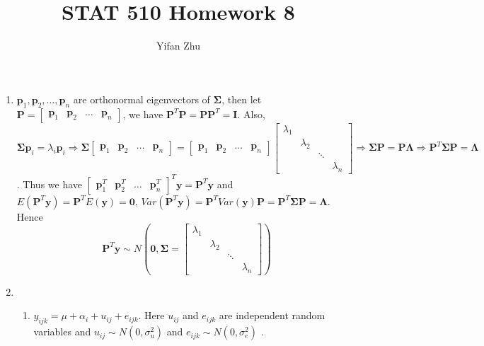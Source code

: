 \documentclass{article}
\begin{document}
\setcounter{MaxMatrixCols}{20}



\title{STAT 510 Homework 8}
\author{Yifan Zhu}
\maketitle

\begin{enumerate}[leftmargin = 0 em, label = \arabic*., font = \bfseries]
	\item
	$\bm p_1, \bm p_2 , \ldots , \bm p_n$ are orthonormal eigenvectors of $\bm \Sigma$, then let $\bm P = \begin{bmatrix}
		\bm p_1 & \bm p_2 & \ldots & \bm p_n
	\end{bmatrix}$, we have $\bm P^T \bm P = \bm P \bm P^T = \bm I$. Also, $\bm \Sigma \bm p_i = \lambda_i  \bm p_i \Rightarrow \bm \Sigma \begin{bmatrix}
		\bm p_1 & \bm p_2 & \ldots & \bm p_n
	\end{bmatrix} = \begin{bmatrix}
		\bm p_1 & \bm p_2 & \ldots & \bm p_n
	\end{bmatrix} \begin{bmatrix}
		\lambda_1 & \\
		& \lambda_2\\
		&& \ddots\\
		&&& \lambda_n

	\end{bmatrix} \Rightarrow \bm \Sigma \bm P= \bm P \bm \Lambda  \Rightarrow \bm P^T \bm \Sigma \bm P = \bm \Lambda$. Thus we have $\begin{bmatrix}
			\bm p_1^T & \bm p_2^T & \ldots & \bm p_n^T
	\end{bmatrix}^T \bm y = \bm P^T \bm y$ and $E\left( \bm P^T \bm y\right) =  \bm P^T E\left( \bm y\right) = \bm 0,\, Var\left( \bm P^T \bm y\right) = \bm P^T Var(\bm y) \bm P = \bm P^T \bm \Sigma \bm P = \bm \Lambda$. Hence
	\[\bm P^T \bm y \sim N\left(\bm 0, \bm \Sigma = \begin{bmatrix}
			\lambda_1\\
			& \lambda_2\\
			&& \ddots\\
			&&& \lambda_n
		\end{bmatrix}\right)\]

	\item
	\begin{enumerate}
		\item 
	$y_{ijk} = \mu + \alpha_i + u_{ij} + e_{ijk}$. Here $u_{ij}$ and $e_{ijk}$ are independent random variables and $u_{ij} \sim N(0, \sigma_{u}^2)$ and $e_{ijk} \sim N(0, \sigma_{e}^2)$ .


\end{enumerate}
\end{enumerate}
\end{document}

